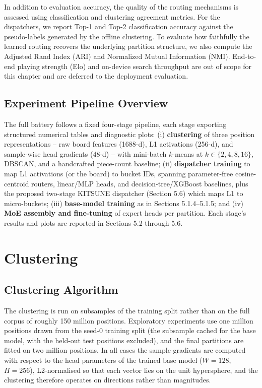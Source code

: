 In addition to evaluation accuracy, the quality of the routing mechanisms is assessed using classification and clustering agreement metrics. For the dispatchers, we report Top-1 and Top-2 classification accuracy against the pseudo-labels generated by the offline clustering. To evaluate how faithfully the learned routing recovers the underlying partition structure, we also compute the Adjusted Rand Index (ARI) and Normalized Mutual Information (NMI). End-to-end playing strength (Elo) and on-device search throughput are out of scope for this chapter and are deferred to the deployment evaluation.

\subsection{Experiment Pipeline Overview}

The full battery follows a fixed four-stage pipeline, each stage exporting structured numerical tables and diagnostic plots: (i) \textbf{clustering} of three position representations -- raw board features (1688-d), L1 activations (256-d), and sample-wise head gradients (48-d) -- with mini-batch $k$-means at $k \in \{2,4,8,16\}$, DBSCAN, and a handcrafted piece-count baseline; (ii) \textbf{dispatcher training} to map L1 activations (or the board) to bucket IDs, spanning parameter-free cosine-centroid routers, linear/MLP heads, and decision-tree/XGBoost baselines, plus the proposed two-stage KITSUNE dispatcher (Section 5.6) which maps L1 to micro-buckets; (iii) \textbf{base-model training} as in Sections 5.1.4--5.1.5; and (iv) \textbf{MoE assembly and fine-tuning} of expert heads per partition. Each stage's results and plots are reported in Sections 5.2 through 5.6.

\section{Clustering}

\subsection{Clustering Algorithm}

The clustering is run on subsamples of the training split rather than on the full corpus of roughly 150 million positions. Exploratory experiments use one million positions drawn from the seed-0 training split (the subsample cached for the base model, with the held-out test positions excluded), and the final partitions are fitted on two million positions. In all cases the sample gradients are computed with respect to the head parameters of the trained base model ($W=128$, $H=256$), L2-normalised so that each vector lies on the unit hypersphere, and the clustering therefore operates on directions rather than magnitudes.

